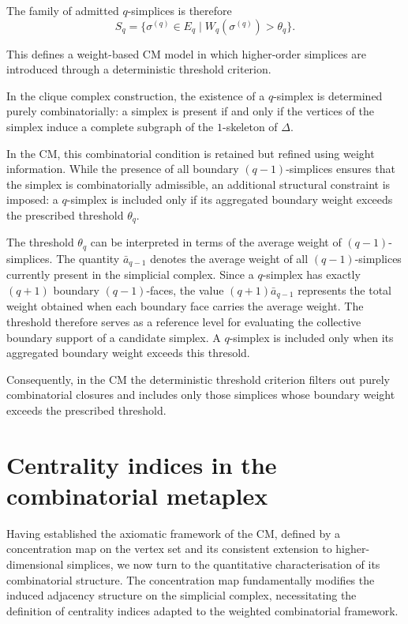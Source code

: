 \documentclass[12pt]{article}
\theoremstyle{normalhead_nobrackets}
\theoremstyle{exampstyle}
\begin{document}
The family of admitted $q$-simplices is therefore
\[
S_q 
= \{ \sigma^{(q)} \in E_q 
\mid W_q(\sigma^{(q)}) > \theta_q \}.
\]

This defines a weight-based CM model in which higher-order simplices are introduced through a deterministic threshold criterion.

In the clique complex construction, the existence of a $q$-simplex is determined purely combinatorially: a simplex is present if and only if the vertices of the simplex induce a complete subgraph of the $1$-skeleton of $\Delta$.

In the CM, this combinatorial condition is retained but refined using weight information. While the presence of all boundary $(q-1)$-simplices ensures that the simplex is combinatorially admissible, an additional structural constraint is imposed: a $q$-simplex is included only if its aggregated boundary weight exceeds the prescribed threshold $\theta_q$.

The threshold $\theta_q$ can be interpreted in terms of the average weight of $(q-1)$-simplices. The quantity $\bar{a}_{q-1}$ denotes the average weight of all $(q-1)$-simplices currently present in the simplicial complex. Since a $q$-simplex has exactly $(q+1)$ boundary $(q-1)$-faces, the value $(q+1)\bar{a}_{q-1}$ represents the total weight obtained when each boundary face carries the average weight. The threshold therefore serves as a reference level for evaluating the collective boundary support of a candidate simplex. A $q$-simplex is included only when its aggregated boundary weight exceeds this thresold.

Consequently, in the CM the deterministic threshold criterion filters out purely combinatorial closures and includes only those simplices whose boundary weight exceeds the prescribed threshold.


\section{Centrality indices in the combinatorial metaplex}\label{1sec:centralities in CM}
Having established the axiomatic framework of the CM, defined by a concentration map on the vertex set and its consistent extension to higher-dimensional simplices, we now turn to the quantitative characterisation of its combinatorial structure. The concentration map fundamentally modifies the induced adjacency structure on the simplicial complex, necessitating the definition of centrality indices adapted to the weighted combinatorial framework.
\end{document}
